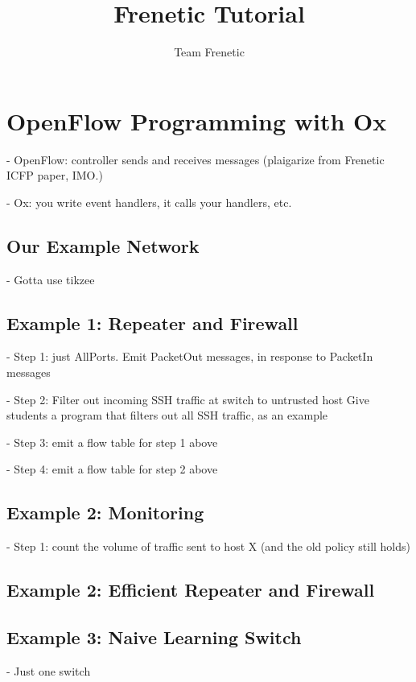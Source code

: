 \documentclass{article}
\title{Frenetic Tutorial}
\author{Team Frenetic}
\begin{document}
\maketitle

\section{OpenFlow Programming with Ox}

- OpenFlow: controller sends and receives messages (plaigarize from Frenetic
  ICFP paper, IMO.)

- Ox: you write event handlers, it calls your handlers, etc.

\subsection{Our Example Network}

- Gotta use tikzee

\subsection{Example 1: Repeater and Firewall}

- Step 1: just AllPorts. 
  Emit PacketOut messages, in response to PacketIn messages

- Step 2: Filter out incoming SSH traffic at switch to untrusted host
  Give students a program that filters out all SSH traffic, as an example

- Step 3: emit a flow table for step 1 above

- Step 4: emit a flow table for step 2 above

\subsection{Example 2: Monitoring}

- Step 1: count the volume of traffic sent to host X 
  (and the old policy still holds)

\subsection{Example 2: Efficient Repeater and Firewall}


\subsection{Example 3: Naive Learning Switch}

- Just one switch
\end{document}
